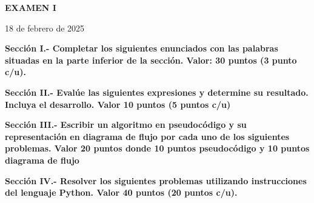 \documentclass[10pt,addpoints]{exam}
\begin{document}
\begin{center}
  \sffamily\textbf{EXAMEN I}
\end{center}
\begin{flushright}
18 de febrero de 2025
\end{flushright}

\begin{questions}
\begin{EnvFullwidth}
  \sffamily\textbf{Sección I.- Completar los siguientes enunciados con las
  palabras situadas en la parte inferior de la sección. Valor: 30 puntos
  (3 punto c/u).}
\end{EnvFullwidth}













\end{questions}

\begin{questions}
\begin{EnvFullwidth}
  \sffamily\textbf{Sección II.- Evalúe las siguientes expresiones y
  determine su resultado. Incluya el desarrollo. Valor 10 puntos (5 puntos
  c/u)}
\end{EnvFullwidth}





\end{questions}

\newpage

\begin{questions}
\begin{EnvFullwidth}
  \sffamily\textbf{Sección III.- Escribir un algoritmo en pseudocódigo y su
  representación en diagrama de flujo por cada uno de los siguientes
  problemas. Valor 20 puntos donde 10 puntos pseudocódigo y 10 puntos
  diagrama de flujo}
\end{EnvFullwidth}


%
%

\end{questions}

\begin{questions}
\begin{EnvFullwidth}
  \sffamily\textbf{Sección IV.- Resolver los siguientes problemas utilizando
  instrucciones del lenguaje Python. Valor 40 puntos (20 puntos c/u).}
\end{EnvFullwidth}



%

\end{questions}
\end{document}
